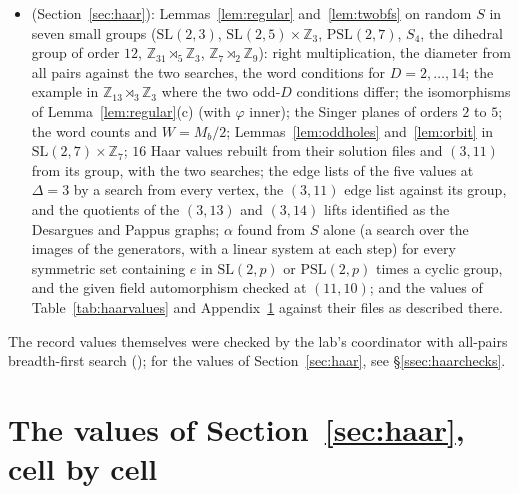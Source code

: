 \documentclass[11pt]{amsart}
\theoremstyle{definition}
\theoremstyle{remark}
\begin{document}
\begin{itemize}[leftmargin=1.5em]
\item {} (Section~\ref{sec:haar}): Lemmas~\ref{lem:regular} and~\ref{lem:twobfs} on random $S$ in seven small groups ($\mathrm{SL}(2,3)$, $\mathrm{SL}(2,5)\times\mathbb{Z}_3$, $\mathrm{PSL}(2,7)$, $S_4$, the dihedral group of order $12$, $\mathbb{Z}_{31}\rtimes_5\mathbb{Z}_3$, $\mathbb{Z}_7\rtimes_2\mathbb{Z}_9$): right multiplication, the diameter from all pairs against the two searches, the word conditions for $D=2,\dots,14$; the example in $\mathbb{Z}_{13}\rtimes_3\mathbb{Z}_3$ where the two odd-$D$ conditions differ; the isomorphisms of Lemma~\ref{lem:regular}(c) (with $\varphi$ inner); the Singer planes of orders $2$ to $5$; the word counts and $W=M_b/2$; Lemmas~\ref{lem:oddholes} and~\ref{lem:orbit} in $\mathrm{SL}(2,7)\times\mathbb{Z}_7$; $16$ Haar values rebuilt from their solution files and $(3,11)$ from its group, with the two searches; the edge lists of the five values at $\Delta=3$ by a search from every vertex, the $(3,11)$ edge list against its group, and the quotients of the $(3,13)$ and $(3,14)$ lifts identified as the Desargues and Pappus graphs; $\alpha$ found from $S$ alone (a search over the images of the generators, with a linear system at each step) for every symmetric set containing $e$ in $\mathrm{SL}(2,p)$ or $\mathrm{PSL}(2,p)$ times a cyclic group, and the given field automorphism checked at $(11,10)$; and the values of Table~\ref{tab:haarvalues} and Appendix~\ref{app:haar} against their files as described there.
\end{itemize}
The record values themselves were checked by the lab's coordinator with all-pairs breadth-first search (); for the values of Section~\ref{sec:haar}, see \S\ref{ssec:haarchecks}.

\section{The values of Section~\ref{sec:haar}, cell by cell}\label{app:haar}
\end{document}

